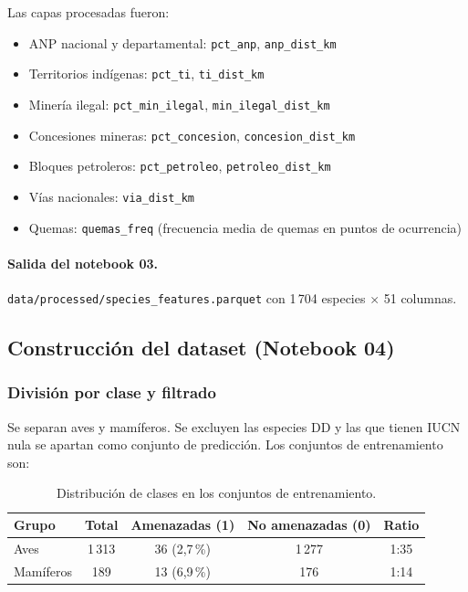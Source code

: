 \documentclass[12pt,a4paper]{article}
\begin{document}
Las capas procesadas fueron:
\begin{itemize}[nosep]
  \item ANP nacional y departamental: \texttt{pct\_anp}, \texttt{anp\_dist\_km}
  \item Territorios indígenas: \texttt{pct\_ti}, \texttt{ti\_dist\_km}
  \item Minería ilegal: \texttt{pct\_min\_ilegal}, \texttt{min\_ilegal\_dist\_km}
  \item Concesiones mineras: \texttt{pct\_concesion}, \texttt{concesion\_dist\_km}
  \item Bloques petroleros: \texttt{pct\_petroleo}, \texttt{petroleo\_dist\_km}
  \item Vías nacionales: \texttt{via\_dist\_km}
  \item Quemas: \texttt{quemas\_freq} (frecuencia media de quemas en puntos de ocurrencia)
\end{itemize}

\paragraph{Salida del notebook 03.}
\texttt{data/processed/species\_features.parquet} con 1\,704 especies $\times$ 51 columnas.

\subsection{Construcción del dataset (Notebook 04)}

\subsubsection{División por clase y filtrado}

Se separan aves y mamíferos.  Se excluyen las especies DD y las que tienen IUCN nula se
apartan como conjunto de predicción.  Los conjuntos de entrenamiento son:

\begin{table}[H]
  \centering
  \caption{Distribución de clases en los conjuntos de entrenamiento.}
  \label{tab:clases}
  \begin{tabular}{lcccc}
    \toprule
    \textbf{Grupo} & \textbf{Total} & \textbf{Amenazadas (1)} & \textbf{No amenazadas (0)} & \textbf{Ratio} \\
    \midrule
    Aves      & 1\,313 &  36 (2,7\,\%) & 1\,277 & 1:35 \\
    Mamíferos &   189  &  13 (6,9\,\%) &   176  & 1:14 \\
    \bottomrule
  \end{tabular}
\end{table}
\end{document}
